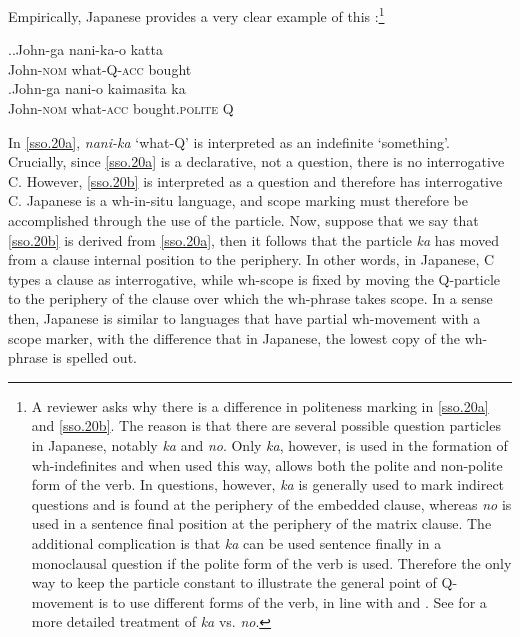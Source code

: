 \documentclass{glossa}
\begin{document}
Empirically, Japanese provides a very clear example of this  \citep{hagstrom:1998}:\footnote{A reviewer asks why there is a difference in politeness marking in \ref{sso.20a} and \ref{sso.20b}. The reason is that there are several possible question particles in Japanese, notably \textit{ka} and \textit{no}. Only \textit{ka}, however, is used in the formation of wh-indefinites and when used this way, allows both the polite and non-polite form of the verb. In questions, however, \textit{ka} is generally used to mark indirect questions and is found at the periphery of the embedded clause, whereas \textit{no} is used in a sentence final position at the periphery of the matrix clause. The additional complication is that \textit{ka} can be used sentence finally in a monoclausal question if the polite form of the verb is used. Therefore the only way to keep the particle constant to illustrate the general point of Q-movement is to use different forms of the verb, in line with \cite{hagstrom:1998} and \cite{cable:2007}. See \cite{miyagawa:1987} for a more detailed treatment of \textit{ka} vs. \textit{no}.}

\ex.\ag.\label{sso.20a}John-ga nani-ka-o katta\\
  John-\textsc{nom} what-Q-\textsc{acc} bought\\
  \bg.\label{sso.20b}John-ga nani-o kaimasita ka\\
  John-\textsc{nom} what-\textsc{acc} bought.\textsc{polite} Q\\

In \ref{sso.20a}, \textit{nani-ka} `what-Q' is interpreted as an indefinite `something'. Crucially, since \ref{sso.20a} is a declarative, not a question, there is no interrogative C. However, \ref{sso.20b} is interpreted as a question and therefore has interrogative C. Japanese is a wh-in-situ language, and scope marking must therefore be accomplished through the use of the particle. Now, suppose that we say that \ref{sso.20b} is derived from \ref{sso.20a}, then it follows that the particle \textit{ka} has moved from a clause internal position to the periphery. In other words, in Japanese, C types a clause as interrogative, while wh-scope is fixed by moving the Q-particle to the periphery of the clause over which the wh-phrase takes scope. In a sense then, Japanese is similar to languages that have partial wh-movement with a scope marker, with the difference that in Japanese, the lowest copy of the wh-phrase is spelled out.
\end{document}
